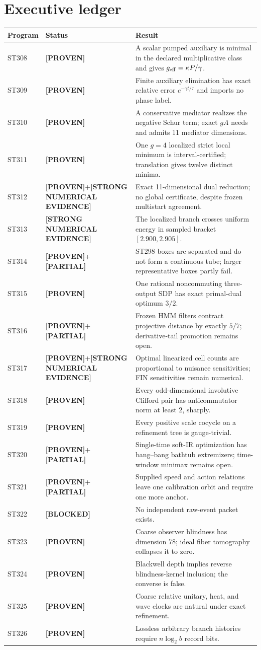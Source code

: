 \documentclass[11pt,a4paper]{article}
\newcommand{\Proven}{\textcolor{proved}{\textbf{[PROVEN]}}}
\newcommand{\Evidence}{\textcolor{conditional}{\textbf{[STRONG NUMERICAL EVIDENCE]}}}
\newcommand{\Partial}{\textcolor{conditional}{\textbf{[PARTIAL]}}}
\newcommand{\Blocked}{\textcolor{blocked}{\textbf{[BLOCKED]}}}
\begin{document}
\section{Executive ledger}
\small
\begin{longtable}{p{}p{}p{}}
\toprule Program&Status&Result\\\midrule\endhead
ST308&\Proven&A scalar pumped auxiliary is minimal in the declared multiplicative class and gives $g_{\rm eff}=\kappa P/\gamma$.\\
ST309&\Proven&Finite auxiliary elimination has exact relative error $e^{-\gamma t/\tau}$ and imports no phase label.\\
ST310&\Proven&A conservative mediator realizes the negative Schur term; exact $gA$ needs and admits 11 mediator dimensions.\\
ST311&\Proven&One $g=4$ localized strict local minimum is interval-certified; translation gives twelve distinct minima.\\
ST312&\Proven{}+\Evidence&Exact 11-dimensional dual reduction; no global certificate, despite frozen multistart agreement.\\
ST313&\Evidence&The localized branch crosses uniform energy in sampled bracket $[2.900,2.905]$.\\
ST314&\Proven{}+\Partial&ST298 boxes are separated and do not form a continuous tube; larger representative boxes partly fail.\\
ST315&\Proven&One rational noncommuting three-output SDP has exact primal-dual optimum $3/2$.\\
ST316&\Proven{}+\Partial&Frozen HMM filters contract projective distance by exactly $5/7$; derivative-tail promotion remains open.\\
ST317&\Proven{}+\Evidence&Optimal linearized cell counts are proportional to nuisance sensitivities; FIN sensitivities remain numerical.\\
ST318&\Proven&Every odd-dimensional involutive Clifford pair has anticommutator norm at least $2$, sharply.\\
ST319&\Proven&Every positive scale cocycle on a refinement tree is gauge-trivial.\\
ST320&\Proven{}+\Partial&Single-time soft-IR optimization has bang--bang bathtub extremizers; time-window minimax remains open.\\
ST321&\Proven{}+\Partial&Supplied speed and action relations leave one calibration orbit and require one more anchor.\\
ST322&\Blocked&No independent raw-event packet exists.\\
ST323&\Proven&Coarse observer blindness has dimension 78; ideal fiber tomography collapses it to zero.\\
ST324&\Proven&Blackwell depth implies reverse blindness-kernel inclusion; the converse is false.\\
ST325&\Proven&Coarse relative unitary, heat, and wave clocks are natural under exact refinement.\\
ST326&\Proven&Lossless arbitrary branch histories require $n\log_2b$ record bits.\\
\bottomrule
\end{longtable}\normalsize
\end{document}
